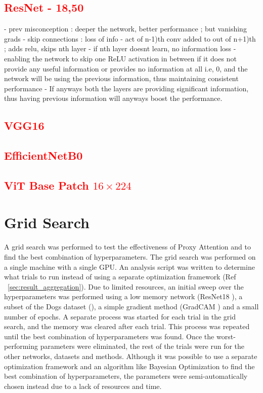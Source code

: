 \subsection{\textcolor{red}{ResNet - 18,50}}
- prev misconception : deeper the network, better performance ; but vanishing grads
- skip connections : loss of info
- act of n-1)th conv added to out of n+1)th ; adds relu, skips nth layer
- if nth layer doesnt learn, no information loss
- enabling the network to skip one ReLU activation in between if it does not provide any useful information or provides no information at all i.e, 0, and the network will be using the previous information, thus maintaining consistent performance
- If anyways both the layers are providing significant information, thus having previous information will anyways boost the performance.

\subsection{\textcolor{red}{VGG16}}
\subsection{\textcolor{red}{EfficientNetB0}}
\subsection{\textcolor{red}{ViT Base Patch $16\times224$}}

\section{Grid Search}
A grid search was performed to test the effectiveness of Proxy Attention and to find the best combination of hyperparameters. The grid search was performed on a single machine with a single GPU. An analysis script was written to determine what trials to run instead of using a separate optimization framework (Ref ~\ref{sec:result_aggregation}).
Due to limited resources, an initial sweep over the hyperparameters was performed using a low memory network (ResNet18 \cite{heDeepResidualLearning2016}), a subset of the Dogs dataset (\cite{khoslaNovelDatasetFineGrained}), a simple gradient method (GradCAM \cite{selvarajuGradCAMVisualExplanations}) and a small number of epochs. A separate process was started for each trial in the grid search, and the memory was cleared after each trial. This process was repeated until the best combination of hyperparameters was found. Once the worst-performing parameters were eliminated, the rest of the trials were run for the other networks, datasets and methods.
Although it was possible to use a separate optimization framework and an algorithm like Bayesian Optimization to find the best combination of hyperparameters, the parameters were semi-automatically chosen instead due to a lack of resources and time.

